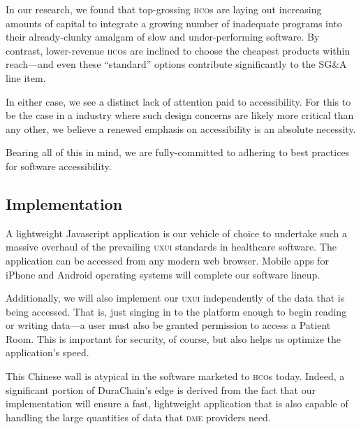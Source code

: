 In our research, we found that top-grossing \textsc{hco}s are laying out increasing amounts of capital to integrate a growing number of inadequate programs into their already-clunky amalgam of slow and under-performing software. By contrast, lower-revenue \textsc{hco}s are inclined to choose the cheapest products within reach---and even these ``standard'' options contribute significantly to the SG\&A line item.%

In either case, we see a distinct lack of attention paid to accessibility. For this to be the case in a industry where such design concerns are likely more critical than any other, we believe a renewed emphasis on accessibility is an absolute necessity.%

Bearing all of this in mind, we are fully-committed to adhering to best practices for software accessibility.%

\subsection{Implementation}
A lightweight Javascript application is our vehicle of choice to undertake such a massive overhaul of the prevailing \textsc{uxui} standards in healthcare software. The application can be accessed from any modern web browser. Mobile apps for iPhone and Android operating systems will complete our software lineup.%

Additionally, we will also implement our \textsc{uxui} independently of the data that is being accessed. That is, just singing in to the platform enough to begin reading or writing data---a user must also be granted permission to access a Patient Room. This is important for security, of course, but also helps us optimize the application's speed.%

This Chinese wall is atypical in the software marketed to \textsc{hco}s today. Indeed, a significant portion of DuraChain's edge is derived from the fact that our implementation will ensure a fast, lightweight application that is also capable of handling the large quantities of data that \textsc{dme} providers need.%
